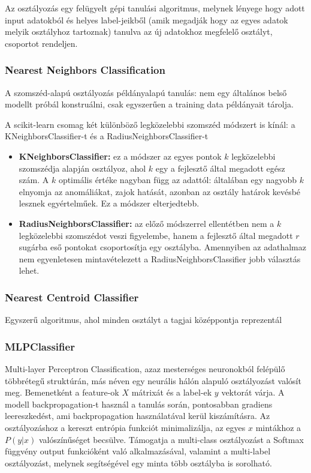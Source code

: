 Az osztályozás egy felügyelt gépi tanulási algoritmus, melynek lényege hogy adott input adatokból és helyes label-jeikből (amik megadják hogy az egyes adatok melyik osztályhoz tartoznak) tanulva az új adatokhoz megfelelő osztályt, csoportot rendeljen. 
\subsubsection{Nearest Neighbors Classification}

A szomszéd-alapú osztályozás példányalapú tanulás: nem egy általános belső modellt próbál konstruálni, csak egyszerűen a training data példányait tárolja.

A scikit-learn csomag két különböző legközelebbi szomszéd módszert is kínál: a KNeighborsClassifier-t és a RadiusNeighborsClassifier-t

\begin{itemize}
	\item \textbf{KNeighborsClassifier:} ez a módszer az egyes pontok $k$ legközelebbi szomszédja alapján osztályoz, ahol $k$ egy a fejlesztő által megadott egész szám. A $k$ optimális értéke nagyban függ az adattól: általában egy nagyobb $k$ elnyomja az anomáliákat, zajok hatását, azonban az osztály határok kevésbé lesznek egyértelműek. Ez a módszer elterjedtebb.  
	
	\item \textbf{RadiusNeighborsClassifier:} az előző módszerrel ellentétben nem a $k$ legközelebbi szomszédot veszi figyelembe, hanem a fejlesztő által megadott $r$ sugárba eső pontokat csoportosítja egy osztályba. Amennyiben az adathalmaz nem egyenletesen mintavételezett a RadiusNeighborsClassifier jobb választás lehet.
\end{itemize}

\subsubsection{Nearest Centroid Classifier}
Egyszerű algoritmus, ahol minden osztályt a tagjai középpontja reprezentál

\subsubsection{MLPClassifier}
Multi-layer Perceptron Classification, azaz mesterséges neuronokból felépülő többrétegű struktúrán, más néven egy neurális hálón alapuló osztályozást valósít meg. Bemenetként a feature-ok $X$ mátrixát és a label-ek $y$ vektorát várja. A modell backpropagation-t használ a tanulás során, pontosabban gradiens leereszkedést, ami backpropagation használatával kerül kiszámításra. Az osztályozáshoz a kereszt entrópia funkciót minimalizálja, az egyes $x$ mintákhoz a $P(y|x)$ valószínűséget becsülve. Támogatja a  multi-class osztályozást a Softmax függvény output funkcióként való alkalmazásával, valamint a multi-label osztályozást, melynek segítségével egy minta több osztályba is sorolható.


